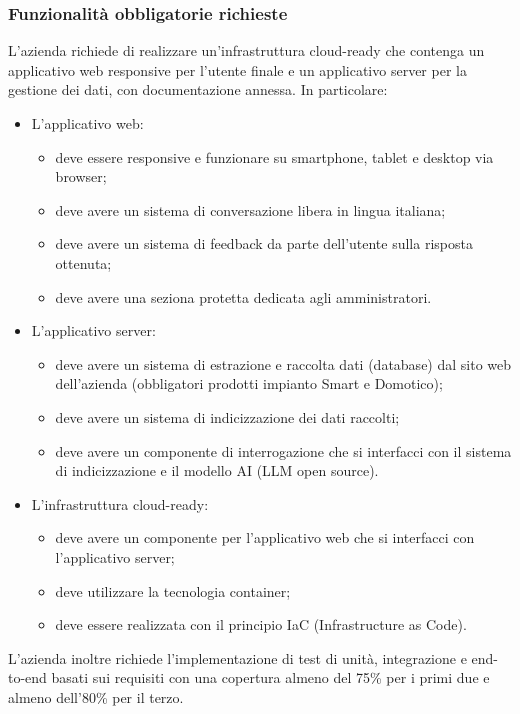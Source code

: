 \documentclass[10pt]{article}
\begin{document}
\subsubsection{Funzionalità obbligatorie richieste}
L’azienda richiede di realizzare un’infrastruttura cloud-ready che contenga un applicativo web responsive per l’utente finale e un applicativo server per la gestione dei dati, con documentazione annessa.
In particolare:

\begin{itemize} 
    \item L’applicativo web: 
    \begin{itemize}
        \item deve essere responsive e funzionare su smartphone, tablet e desktop via browser;
        \item deve avere un sistema di conversazione libera in lingua italiana;
        \item deve avere un sistema di feedback da parte dell’utente sulla risposta ottenuta;
        \item deve avere una seziona protetta dedicata agli amministratori.
    \end{itemize}
    \item L’applicativo server: 
    \begin{itemize}
        \item deve avere un sistema di estrazione e raccolta dati (database) dal sito web dell’azienda (obbligatori prodotti impianto Smart e Domotico);
        \item deve avere un sistema di indicizzazione dei dati raccolti;
        \item deve avere un componente di interrogazione che si interfacci con il sistema di indicizzazione e il modello AI (LLM open source).
    \end{itemize}
    \item L’infrastruttura cloud-ready: 
    \begin{itemize}
        \item deve avere un componente per l’applicativo web che si interfacci con l’applicativo server;
        \item deve utilizzare la tecnologia container;
        \item deve essere realizzata con il principio IaC (Infrastructure as Code).
    \end{itemize}
\end{itemize}
L’azienda inoltre richiede l’implementazione di test di unità, integrazione e end-to-end basati sui requisiti con una copertura almeno del 75\% per i primi due e almeno dell’80\% per il terzo.
\end{document}
